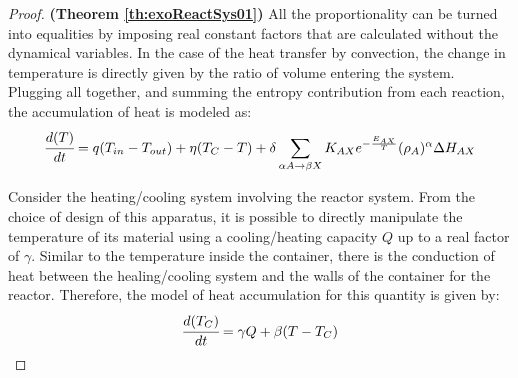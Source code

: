 \documentclass[a4paper,11pt]{book}
\numberwithin{figure}{chapter}
\numberwithin{equation}{chapter}
\numberwithin{table}{chapter}
\theoremstyle{definition}
\begin{document}
\begin{proof}{\textbf{(Theorem \ref{th:exoReactSys01})}}
	All the proportionality can be turned into equalities by imposing real constant factors that are calculated without the dynamical variables. In the case of the heat transfer by convection, the change in temperature is directly given by the ratio of volume entering the system. Plugging all together, and summing the entropy contribution from each reaction, the  accumulation of heat is modeled as:
	\begin{equation}
		\cfrac{d(T)}{dt} = q(T_{in} - T_{out}) + \eta (T_C - T) + \delta \sum_{\alpha A \rightarrow \beta X} K_{AX} e^{-\frac{E_{AX}}{T}} (\rho_A)^{\alpha} \Delta H_{AX}
	\end{equation}
	
	Consider the heating/cooling system involving the reactor system. From the choice of design of this apparatus, it is possible to directly manipulate the temperature of its material using a cooling/heating capacity $Q$ up to a real factor of $\gamma$. Similar to the temperature inside the container, there is the conduction of heat between the healing/cooling system and the walls of the container for the reactor. Therefore, the model of heat accumulation for this quantity is given by:
	\begin{equation}
		\cfrac{d(T_C)}{dt} = \gamma Q + \beta (T - T_C)
	\end{equation}
\end{proof}
\end{document}
